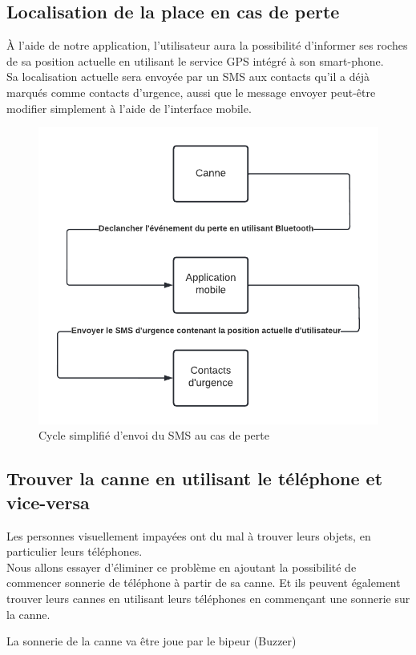 \subsection{Localisation de la place en cas de perte}

À l'aide de notre application, l'utilisateur aura la possibilité d'informer ses roches de sa position actuelle en utilisant le service GPS intégré à son smart-phone.\\
Sa localisation actuelle sera envoyée par un SMS aux contacts qu'il a déjà marqués comme contacts d'urgence, aussi que le message envoyer peut-être modifier simplement à l'aide de l'interface mobile.

\begin{figure}[!htbp]
    \centering
    \includegraphics[width=.7\linewidth]{assets/principe d'envoie du SMS de perte.png}
    \caption{Cycle simplifié d'envoi du SMS au cas de perte}
\end{figure}

\FloatBarrier

\subsection{Trouver la canne en utilisant le téléphone et vice-versa}
Les personnes visuellement impayées ont du mal à trouver leurs objets, en particulier leurs téléphones. \\
Nous allons essayer d’éliminer ce problème en ajoutant la possibilité de commencer sonnerie de téléphone à partir de sa canne. Et ils peuvent également trouver leurs cannes en utilisant leurs téléphones en commençant une sonnerie sur la canne.

La sonnerie de la canne va être joue par le bipeur (Buzzer)

